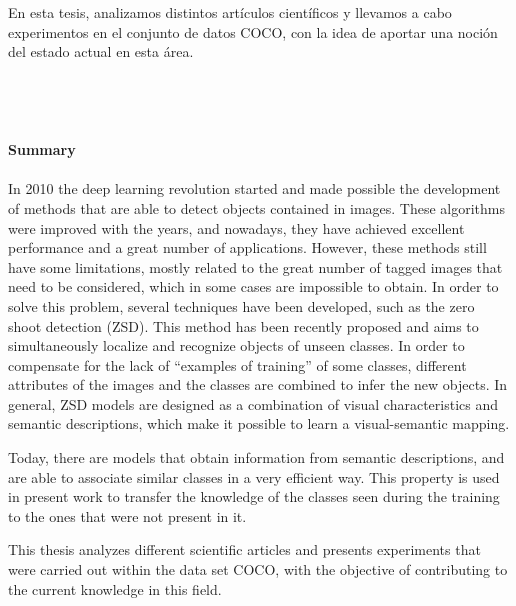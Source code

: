 \documentclass[12pt,twosided]{book}
\begin{document}
En esta tesis, analizamos distintos artículos científicos y llevamos a cabo experimentos en el conjunto de datos COCO, con la idea de aportar una noción del estado actual en esta área. \\ \\ \\ \\ \\
{\huge\textbf{Summary}}\\\\
In 2010 the deep learning revolution started and made possible the development of methods that are able to detect objects contained in images. These algorithms were improved with the years, and nowadays, they have achieved excellent performance and a great number of applications. However, these methods still have some limitations, mostly related to the great number of tagged images that need to be considered, which in some cases are impossible to obtain. In order to solve this problem, several techniques have been developed, such as the zero shoot detection (ZSD). This method has been recently proposed and aims to simultaneously localize and recognize objects of unseen classes. In order to compensate for the lack of ``examples of training'' of some classes, different attributes of the images and the classes are combined to infer the new objects. In general, ZSD models are designed as a combination of visual characteristics and semantic descriptions, which make it possible to learn a visual-semantic mapping.

Today, there are models that obtain information from semantic descriptions, and are able to associate similar classes in a very efficient way. This property is used in present work to transfer the knowledge of the classes seen during the training to the ones that were not present in it.

This thesis analyzes different scientific articles and presents experiments that were carried out within the data set COCO, with the objective of contributing to the current knowledge in this field. 

\begingroup
\hypersetup{hidelinks}
\tableofcontents
\endgroup

\mainmatter %
\pagestyle{headings}
\end{document}
